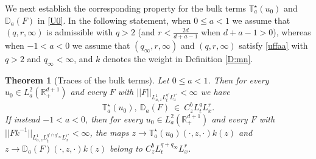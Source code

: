 \documentclass[11pt,letter]{amsart}
\def \RN {\mathbb{R}_+^{d+1}}
\numberwithin{equation}{section}
\newtheorem{theorem}{Theorem}[section]
\numberwithin{equation}{section}
\begin{document}
\vskip 0.2in

We next establish the corresponding property for the bulk terms $\mathbb T^\star_a(u_0)$ and $\mathbb D_a(F)$ in \eqref{U0}. In the following statement, when $0\le a<1$ we assume that $(q,r,\infty)$ is admissible with $q>2$ (and $r<\frac{2d}{d+a-1}$ when $d+a-1>0$), whereas when $-1<a<0$ we assume that $(q_\infty,r,\infty)$ and $(q,r,\infty)$ satisfy \eqref{uffaa} with $q>2$ and $q_\infty<\infty$, and $k$ denotes the weight in Definition \ref{D:mn}.

\begin{theorem}[Traces of the bulk terms]\label{T:gapbulk}
Let $0\le a<1$. Then for every $u_0\in L^2_a(\RN)$ and every $F$ with $||F||_{L^1_{a,z}L^{q'}_tL^{r'}_x}<\infty$ we have
\[
\mathbb T^\star_a(u_0),\ \mathbb D_a(F)\ \in\ C^b_zL^q_tL^r_x.
\]
If instead $-1<a<0$, then for every $u_0\in L^2_a(\RN)$ and every $F$ with $||Fk^{-1}||_{L^1_{a,z}L^{q'\cap q'_\infty}_tL^{r'}_x}<\infty$, the maps $z\to \mathbb T^\star_a(u_0)(\cdot,z,\cdot)k(z)$ and $z\to \mathbb D_a(F)(\cdot,z,\cdot)k(z)$ belong to $C^b_zL^{q+q_\infty}_tL^r_x$.
\end{theorem}
\end{document}
